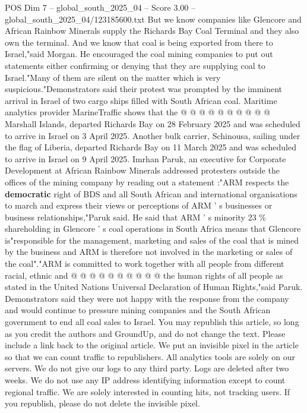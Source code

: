 \begin{textsample}{POS Dim 7 – global\_south\_2025\_04 – Score 3.00 – global\_south\_2025\_04/123185600.txt}
But we know companies like Glencore and African Rainbow Minerals supply the Richards Bay Coal Terminal and they also own the terminal.
And we know that coal is being exported from there to Israel,"said Morgan.
He encouraged the coal mining companies to put out statements either confirming or denying that they are supplying coal to Israel."Many of them are silent on the matter which is very suspicious."Demonstrators said their protest was prompted by the imminent arrival in Israel of two cargo ships filled with South African coal.
Maritime analytics provider MarineTraffic shows that the @ @ @ @ @ @ @ @ @ @ Marshall Islands, departed Richards Bay on 28 February 2025 and was scheduled to arrive in Israel on 3 April 2025.
Another bulk carrier, Schinousa, sailing under the flag of Liberia, departed Richards Bay on 11 March 2025 and was scheduled to arrive in Israel on 9 April 2025.
Imrhan Paruk, an executive for Corporate Development at African Rainbow Minerals addressed protesters outside the offices of the mining company by reading out a statement :"ARM respects the \textbf{democratic} right of BDS and all South African and international organisations to march and express their views or perceptions of ARM ' s businesses or business relationships,"Paruk said.
He said that ARM ' s minority 23 \% shareholding in Glencore ' s coal operations in South Africa means that Glencore is"responsible for the management, marketing and sales of the coal that is mined by the business and ARM is therefore not involved in the marketing or sales of the coal"."ARM is committed to work together with all people from different racial, ethnic and @ @ @ @ @ @ @ @ @ @ the human rights of all people as stated in the United Nations Universal Declaration of Human Rights,"said Paruk.
Demonstrators said they were not happy with the response from the company and would continue to pressure mining companies and the South African government to end all coal sales to Israel.
You may republish this article, so long as you credit the authors and GroundUp, and do not change the text.
Please include a link back to the original article.
We put an invisible pixel in the article so that we can count traffic to republishers.
All analytics tools are solely on our servers.
We do not give our logs to any third party.
Logs are deleted after two weeks.
We do not use any IP address identifying information except to count regional traffic.
We are solely interested in counting hits, not tracking users.
If you republish, please do not delete the invisible pixel.

\end{textsample}
